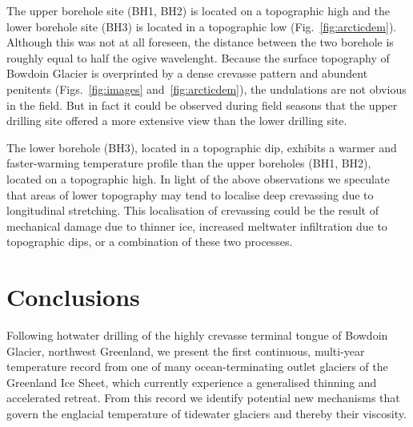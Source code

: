 \documentclass[utf8]{article}
\begin{document}
    The upper borehole site (BH1, BH2) is located on a topographic high and the
    lower borehole site (BH3) is located in a topographic low
    (Fig.~\ref{fig:arcticdem}). Although this
    was not at all foreseen, the distance between the two borehole is roughly
    equal to half the ogive wavelenght. Because the surface topography of
    Bowdoin Glacier is overprinted by a dense crevasse pattern and abundent
    penitents (Figs.~\ref{fig:images} and~\ref{fig:arcticdem}), the undulations
    are not obvious in the field.  But in fact it
    could be observed during field seasons that the upper drilling site offered
    a more extensive view than the lower drilling site.

    The lower borehole (BH3), located in a topographic dip, exhibits a warmer
    and faster-warming temperature profile than the upper boreholes (BH1, BH2),
    located on a topographic high. In light of the above observations we
    speculate that areas of lower topography may tend to localise deep
    crevassing due to longitudinal stretching. This localisation of crevassing
    could be the result of mechanical damage due to thinner ice, increased
    meltwater infiltration due to topographic dips, or a combination of these
    two processes.


\section{Conclusions}

    Following hotwater drilling of the highly crevasse terminal tongue of
    Bowdoin Glacier, northwest Greenland, we present the first continuous,
    multi-year temperature record from one of many ocean-terminating outlet
    glaciers of the Greenland Ice Sheet, which currently experience a
    generalised thinning and accelerated retreat. From this record we identify
    potential new mechanisms that govern the englacial temperature of tidewater
    glaciers and thereby their viscosity.
\end{document}
